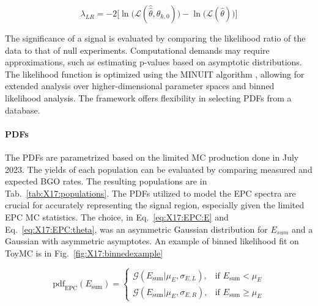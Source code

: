 \begin{refsection}
        \begin{equation}
        \label{eq:X17:LR}
            \lambda_{LR} = -2\biggl[\ln\bigl( \mathcal{L}(\hat{\hat{\theta}},\theta_{k,0}) \bigr) - \ln\bigl( \mathcal{L}(\hat{\theta}) \bigr)\biggr]
        \end{equation}
        
        \noindent
        The significance of a signal is evaluated by comparing the likelihood ratio of the data to that of null experiments. 
        Computational demands may require approximations, such as estimating p-values based on asymptotic distributions. 
        The likelihood function is optimized using the MINUIT algorithm \cite{MINUIT}\cite{MINUIT:manual}, allowing for extended analysis over higher-dimensional parameter spaces and binned likelihood analysis. 
        The framework offers flexibility in selecting PDFs from a database.


        
        \paragraph{PDFs}
        The PDFs are parametrized based on the limited MC production done in July 2023.
        The yields of each population can be evaluated by comparing measured and expected BGO rates. 
        The resulting populations are in Tab.~\ref{tab:X17:populations}.
        The PDFs utilized to model the EPC spectra are crucial for accurately representing the signal region, especially given the limited EPC MC statistics.
        The choice, in Eq.~\ref{eq:X17:EPC:E} and Eq.~\ref{eq:X17:EPC:theta}, was an asymmetric Gaussian distribution for $E_{sum}$ and a Gaussian with asymmetric asymptotes.
        An example of binned likelihood fit on ToyMC is in Fig.~\ref{fig:X17:binnedexample}

        \begin{equation}
        \label{eq:X17:EPC:E}
            \text{pdf}_{\text{EPC}}(E_{\text{sum}}) = 
            \begin{cases}
                \mathcal{G}(E_{\text{sum}} | \mu_E, \sigma_{E,L}), & \text{if } E_{\text{sum}} < \mu_E \\
                \mathcal{G}(E_{\text{sum}} | \mu_E, \sigma_{E,R}), & \text{if } E_{\text{sum}} \geq \mu_E
            \end{cases}
        \end{equation}


\end{refsection}
